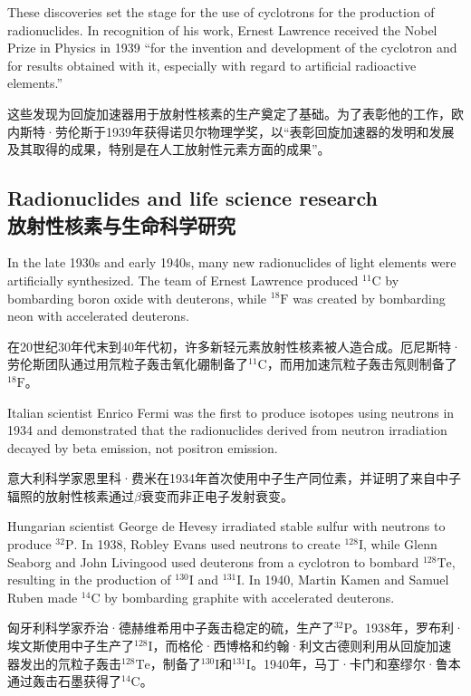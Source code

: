 \documentclass[dvipsnames, svgnames,a4paper,11pt]{article}
\begin{document}
These discoveries set the stage for the use of cyclotrons for the production of radionuclides. In recognition of his work, Ernest Lawrence received the Nobel Prize in Physics in 1939 “for the invention and development of the cyclotron and for results obtained with it, especially with regard to artificial radioactive elements.”

这些发现为回旋加速器用于放射性核素的生产奠定了基础。为了表彰他的工作，欧内斯特·劳伦斯于1939年获得诺贝尔物理学奖，以“表彰回旋加速器的发明和发展及其取得的成果，特别是在人工放射性元素方面的成果”。

\subsection{Radionuclides and life science research\\放射性核素与生命科学研究}

In the late 1930s and early 1940s, many new radionuclides of light elements were artificially synthesized. The team of Ernest Lawrence produced ${}^\text{11}\text{C}$ by bombarding boron oxide with deuterons, while ${}^\text{18}\text{F}$ was created by bombarding neon with accelerated deuterons.

在20世纪30年代末到40年代初，许多新轻元素放射性核素被人造合成。厄尼斯特·劳伦斯团队通过用氘粒子轰击氧化硼制备了${}^\text{11}\text{C}$，而用加速氘粒子轰击氖则制备了${}^\text{18}\text{F}$。

Italian scientist Enrico Fermi was the first to produce isotopes using neutrons in 1934 and demonstrated that the radionuclides derived from neutron irradiation decayed by beta emission, not positron emission.

意大利科学家恩里科·费米在1934年首次使用中子生产同位素，并证明了来自中子辐照的放射性核素通过$\beta$衰变而非正电子发射衰变。

Hungarian scientist George de Hevesy irradiated stable sulfur with neutrons to produce ${}^\text{32}\text{P}$. In 1938, Robley Evans used neutrons to create ${}^\text{128}\text{I}$, while Glenn Seaborg and John Livingood used deuterons from a cyclotron to bombard ${}^\text{128}\text{Te}$, resulting in the production of ${}^\text{130}\text{I}$ and ${}^\text{131}\text{I}$. In 1940, Martin Kamen and Samuel Ruben made ${}^\text{14}\text{C}$ by bombarding graphite with accelerated deuterons.

匈牙利科学家乔治·德赫维希用中子轰击稳定的硫，生产了${}^\text{32}\text{P}$。1938年，罗布利·埃文斯使用中子生产了${}^\text{128}\text{I}$，而格伦·西博格和约翰·利文古德则利用从回旋加速器发出的氘粒子轰击${}^\text{128}\text{Te}$，制备了${}^\text{130}\text{I}$和${}^\text{131}\text{I}$。1940年，马丁·卡门和塞缪尔·鲁本通过轰击石墨获得了${}^\text{14}\text{C}$。
\end{document}
